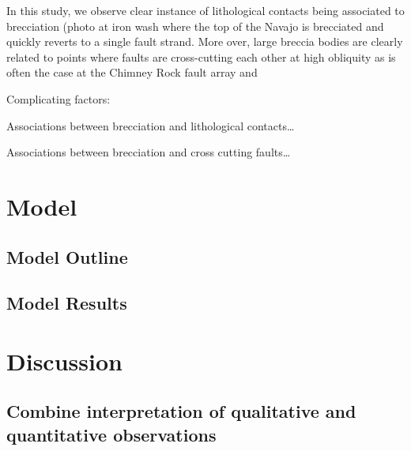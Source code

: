 \documentclass[12pt,a4paper]{article}
\begin{document}
In this study, we observe clear instance of lithological contacts being associated to brecciation (photo at iron wash where the top of the Navajo is brecciated and quickly reverts to a single fault strand. More over, large breccia bodies are clearly related to points where faults are cross-cutting each other at high obliquity as is often the case at the Chimney Rock fault array and 

Complicating factors:

Associations between brecciation and lithological contacts…

Associations between brecciation and cross cutting faults…

		

\section{Model}
	\subsection{Model Outline}
	\subsection{Model Results}

\section{Discussion}

	\subsection{Combine interpretation of qualitative and quantitative observations}


\end{document}
